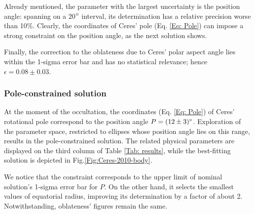 \documentclass[useAMS,usenatbib]{mn2e}
\begin{document}
Already mentioned, the parameter with the largest uncertainty is the position angle: spanning on a 20$\hbox{$^\circ$}$ interval, its determination has a relative precision worse than 10$\%$. Clearly, the coordinates of Ceres' pole (Eq. \ref{Eq: Pole}) can impose a strong constraint on the position angle, as the next solution shows.

Finally, the correction to the oblateness due to Ceres' polar aspect angle lies within the 1-sigma error bar and has no statistical relevance; hence $\epsilon = 0.08 \pm 0.03$.





\subsubsection{Pole-constrained solution}

At the moment of the occultation, the coordinates (Eq. \ref{Eq: Pole}) of Ceres' rotational pole correspond to the position angle $P = (12 \pm 3)\hbox{$^\circ$}$. Exploration of the parameter space, restricted to ellipses whose position angle lies on this range, results in the pole-constrained solution. The related physical parameters are displayed on the third column of Table \ref{Tab: results}, while the best-fitting solution is depicted in Fig.\ref{Fig:Ceres-2010-body}.

We notice that the constraint corresponds to the upper limit of nominal solution's 1-sigma error bar for $P$. On the other hand, it selects the smallest values of equatorial radius, improving its determination by a factor of about 2. Notwithstanding, oblateness' figures remain the same.
\end{document}
